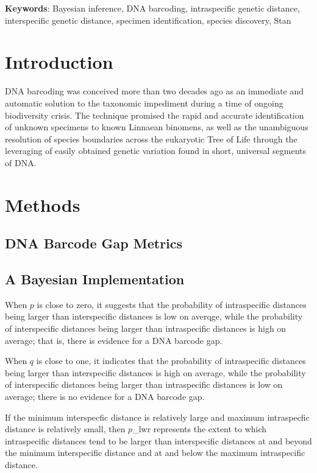 \documentclass[12pt]{article}
\begin{document}
\textbf{Keywords}: Bayesian inference, DNA barcoding, intraspecific genetic distance, \\ interspecific genetic distance, specimen identification, species discovery, Stan 

\vspace{2mm}

\section{Introduction}

DNA barcoding \citep{hebert2003biological, hebert2003barcoding} was conceived more than two decades ago as an immediate and automatic solution to the taxonomic impediment during a time of ongoing biodiversity crisis. The technique promised the rapid and accurate identification of unknown specimens to known Linnaean binomens, as well as the unambiguous resolution of species boundaries across the eukaryotic Tree of Life through the leveraging of easily obtained genetic variation found in short, universal segments of DNA.


\section{Methods}

\subsection{DNA Barcode Gap Metrics}

\subsection{A Bayesian Implementation}

When $p$ is close to zero, it suggests that the probability of intraspecific distances being larger than interspecific distances is low on averqge, while the probability of interspecific distances being larger than intraspecific distances is high on average; that is, there is evidence for a DNA barcode gap.

When $q$ is close to one, it indicates that the probability of intraspecific distances being larger than interspecific distances is high on average, while the probability of interspecific distances being larger than intraspecific distances is low on average; there is no evidence for a DNA barcode gap.

If the minimum interspecfic distance is relatively large and maximum intraspecfic distance is relatively small, then $p$\_{lwr} represents the extent to which intraspecific distances
tend to be larger than interspecific distances at and beyond the minimum interspecific distance and at and below the maximum intraspecific distance.
\end{document}
